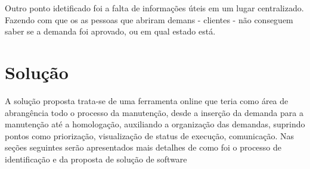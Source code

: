 Outro ponto idetificado foi a falta de informações úteis em um lugar centralizado. Fazendo com que os as pessoas que abriram demans - clientes -
não conseguem saber se a demanda foi aprovado, ou em qual estado está.

\section{Solução}

A solução proposta trata-se de uma ferramenta online que teria como área de abrangência todo o processo da manutenção, desde a inserção da demanda para a manutenção até a homologação, auxiliando a organização das demandas, suprindo pontos como priorização, visualização de status de execução, comunicação. Nas seções seguintes serão apresentados mais detalhes de como foi o processo de identificação e da proposta de solução de software
